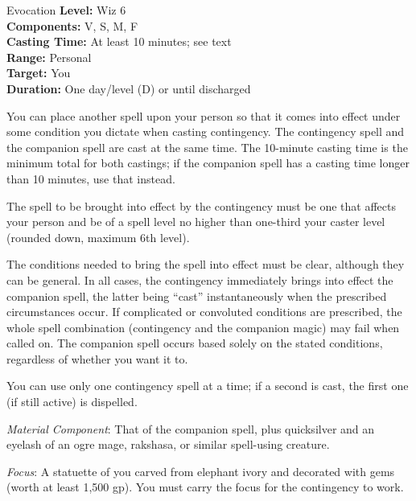 {Evocation}
{
	\textbf{Level:}
	Wiz 6\\
	\textbf{Components:}
	V, S, M, F\\
	\textbf{Casting Time:}
	At least 10 minutes; see text\\
	\textbf{Range:}
	Personal\\
	\textbf{Target:}
	You\\
	\textbf{Duration:}
	One day/level (D) or until discharged\\
}
{
	You can place another spell upon your person so that it comes into effect under some condition you dictate when casting contingency. The contingency spell and the companion spell are cast at the same time. The 10-minute casting time is the minimum total for both castings; if the companion spell has a casting time longer than 10 minutes, use that instead.

	The spell to be brought into effect by the contingency must be one that affects your person and be of a spell level no higher than one-third your caster level (rounded down, maximum 6th level).

	The conditions needed to bring the spell into effect must be clear, although they can be general. In all cases, the contingency immediately brings into effect the companion spell, the latter being ``cast'' instantaneously when the prescribed circumstances occur. If complicated or convoluted conditions are prescribed, the whole spell combination (contingency and the companion magic) may fail when called on. The companion spell occurs based solely on the stated conditions, regardless of whether you want it to.

	You can use only one contingency spell at a time; if a second is cast, the first one (if still active) is dispelled.

	\textit{Material Component}:
	That of the companion spell, plus quicksilver and an eyelash of an ogre mage, rakshasa, or similar spell-using creature.

	\textit{Focus}:
	A statuette of you carved from elephant ivory and decorated with gems (worth at least 1,500 gp). You must carry the focus for the contingency to work.

}
